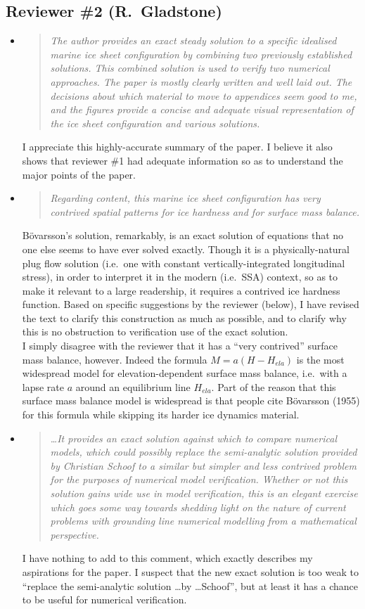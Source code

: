\documentclass[11pt,reqno]{amsart}
\renewcommand{\dh}{\fontencoding{T1}\selectfont{\symbol{240}}}
\newcommand{\bod}{B\"o\dh varsson\xspace}
\newcommand{\citebod}{B\"o\dh varsson (1955)\xspace}
\newcommand{\reply}[2]{
\medskip\medskip
\item  \begin{quote}
\emph{#1}
\end{quote}

\medskip
\noindent #2}
\begin{document}
\subsection*{Reviewer \#2 (R.~Gladstone)}  \begin{itemize}
\reply{The author provides an exact steady solution to a specific idealised marine ice sheet configuration by combining two previously established solutions. This combined solution is used to verify two numerical approaches. The paper is mostly clearly written and well laid out. The decisions about which material to move to appendices seem good to me, and the figures provide a concise and adequate visual representation of the ice sheet configuration and various solutions.}
{I appreciate this highly-accurate summary of the paper.  I believe it also shows that reviewer \#1 had adequate information so as to understand the major points of the paper.}

\reply{Regarding content, this marine ice sheet configuration has very contrived spatial patterns for ice hardness and for surface mass balance.}
{\bod's solution, remarkably, is an exact solution of equations that no one else seems to have ever solved exactly.  Though it is a physically-natural plug flow solution (i.e.~one with constant vertically-integrated longitudinal stress), in order to interpret it in the modern (i.e.~SSA) context, so as to make it relevant to a large readership, it requires a contrived ice hardness function.  Based on specific suggestions by the reviewer (below), I have revised the text to clarify this construction as much as possible, and to clarify why this is no obstruction to verification use of the exact solution. \medskip \\
I simply disagree with the reviewer that it has a ``very contrived'' surface mass balance, however.  Indeed the formula $M=a(H-H_{ela})$ is the most widespread model for elevation-dependent surface mass balance, i.e.~with a lapse rate $a$ around an equilibrium line $H_{ela}$.  Part of the reason that this surface mass balance model is widespread is that people cite \citebod for this formula while skipping its harder ice dynamics material.}

\reply{\dots It provides an exact solution against which to compare numerical models, which could possibly replace the semi-analytic solution provided by Christian Schoof to a similar but simpler and less contrived problem for the purposes of numerical model verification.  Whether or not this solution gains wide use in model verification, this is an elegant exercise which goes some way towards shedding light on the nature of current problems with grounding line numerical modelling from a mathematical perspective.}
{I have nothing to add to this comment, which exactly describes my aspirations for the paper.  I suspect that the new exact solution is too weak to ``replace the semi-analytic solution \dots by \dots Schoof'', but at least it has a chance to be useful for numerical verification.}


\end{itemize}
\end{document}
